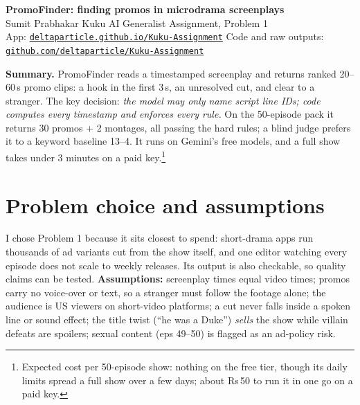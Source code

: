 \documentclass[10pt]{article}
\begin{document}
\begin{center}
{\Large\bfseries PromoFinder: finding promos in microdrama screenplays}\\[4pt]
Sumit Prabhakar \textperiodcentered{} Kuku AI Generalist Assignment, Problem 1\\[1pt]
{\small App: \href{https://deltaparticle.github.io/Kuku-Assignment/}{\texttt{deltaparticle.github.io/Kuku-Assignment}}
\quad Code and raw outputs: \href{https://github.com/deltaparticle/Kuku-Assignment}{\texttt{github.com/deltaparticle/Kuku-Assignment}}}
\end{center}

\textbf{Summary.} PromoFinder reads a timestamped screenplay and returns ranked 20--60\,s promo clips: a hook in the
first 3\,s, an unresolved cut, and clear to a stranger. The key decision: \emph{the model may only name script line IDs;
code computes every timestamp and enforces every rule.} On the 50-episode pack it returns 30 promos + 2 montages,
all passing the hard rules; a blind judge prefers it to a keyword baseline 13--4. It runs on Gemini's free models, and
a full show takes under 3 minutes on a paid key.\footnote{Expected cost per 50-episode show: nothing on the free tier,
though its daily limits spread a full show over a few days; about Rs\,50 to run it in one go on a paid key.}

\section{Problem choice and assumptions}
I chose Problem 1 because it sits closest to spend: short-drama apps run thousands of ad variants cut from the show
itself, and one editor watching every episode does not scale to weekly releases. Its output is also checkable, so
quality claims can be tested. \textbf{Assumptions:} screenplay times equal video times; promos carry no voice-over or
text, so a stranger must follow the footage alone; the audience is US viewers on short-video platforms; a cut never
falls inside a spoken line or sound effect; the title twist (``he was a Duke'') \emph{sells} the show while villain
defeats are spoilers; sexual content (eps 49--50) is flagged as an ad-policy risk.
\end{document}
